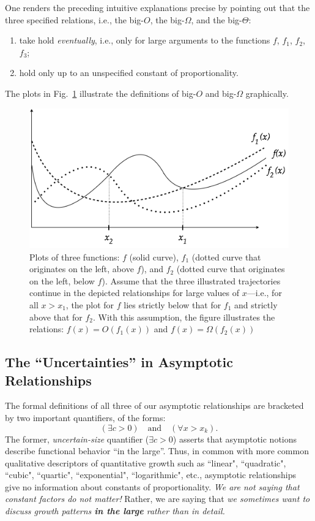 One renders the preceding intuitive explanations precise by pointing out that the three specified relations, i.e., the big-$O$, the big-$\Omega$, and the big-$\Theta$:
\begin{enumerate}
\item
take hold {\em eventually}, i.e., only for large arguments to the functions $f$, $f_1$, $f_2$, $f_3$;
\medskip\item
hold only up to an unspecified constant of proportionality.
\end{enumerate}
The plots in Fig.~\ref{fig:Asymptotic} illustrate the definitions of big-$O$ and big-$\Omega$ graphically.
\begin{figure}[htb]
\begin{center}
       \includegraphics[scale=0.4]{FiguresArithmetic/NotationAsymptotic}
\caption{Plots of three functions: $f$ (solid curve), $f_1$ (dotted curve that originates on the left, above $f$), and $f_2$ (dotted curve that originates on the left, below $f$).  Assume that the three illustrated trajectories continue in the depicted relationships for large values of $x$---i.e., for all $x > x_1$, the plot for $f$ lies strictly below that for $f_1$ and strictly above that for $f_2$.  With this assumption, the figure illustrates the relations: $f(x) = O(f_1(x))$ and $f(x) = \Omega(f_2(x))$}
\label{fig:Asymptotic}
\end{center}
\end{figure}

\subsection{The ``Uncertainties'' in Asymptotic Relationships}
\label{sec:uncertainties-asymptotics}

The formal definitions of all three of our asymptotic relationships are bracketed by two important quantifiers, of the forms:
\[ 
(\exists c >0) \ \ \ \mbox{ and }  \ \ \  (\forall x > x_k).
\]
The former, {\em uncertain-size} quantifier ($\exists c >0$) asserts that asymptotic notions describe functional behavior ``in the large''.  Thus, in common with more common qualitative descriptors of quantitative growth such as ``linear", ``quadratic", ``cubic", ``quartic", ``exponential", ``logarithmic", etc., asymptotic relationships give no information about constants of proportionality.  {\em We are not saying that constant factors do not matter!}  Rather, we are saying that {\em we sometimes want to discuss growth patterns {\bf in the large} rather than in detail.}

